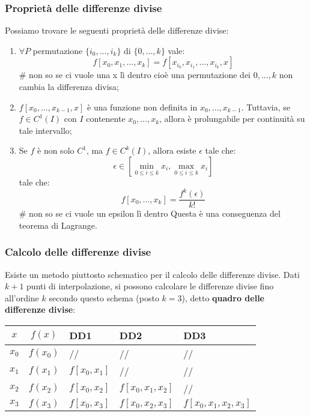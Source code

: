 \documentclass[a4paper,11pt]{article}
\begin{document}
\subsubsection{Proprietà delle differenze divise}
Possiamo trovare le seguenti proprietà delle differenze divise:
\begin{enumerate}
	\item $\forall P$ permutazione $\{i_0, ..., i_k\}$ di $\{0, ..., k \}$ vale:
		$$
			f[x_0, x_1, ..., x_k] = f[x_{i_0}, x_{i_1}, ..., x_{i_k}, x]
		$$ # non so se ci vuole una x lì dentro
		cioè una permutazione dei $0, ..., k$ non cambia la differenza divisa;

	\item $f[x_0, ..., x_{k - 1}, x]$ è una funzione non definita in $x_0, ..., x_{k-1}$.
		Tuttavia, se $f \in C^1(I)$ con $I$ contenente $x_0, ..., x_k$, allora è prolungabile per continuità su tale intervallo;

	\item Se $f$ è non solo $C^1$, ma $f \in C^k(I)$, allora esiste $\epsilon$ tale che:
		$$
		\epsilon \in \left[ \min_{0 \leq i \leq k} x_i, \max_{0 \leq i \leq k} x_i \right]
		$$
		tale che:
		$$
		f[x_0, ..., x_k] = \frac{f^{k} (\epsilon) }{ k! }
		$$ # non so se ci vuole un epsilon lì dentro
		Questa è una conseguenza del teorema di Lagrange.
\end{enumerate}

\subsubsection{Calcolo delle differenze divise}
Esiste un metodo piuttosto schematico per il calcolo delle differenze divise.
Dati $k + 1$ punti di interpolazione, si possono calcolare le differenze divise fino all'ordine $k$ secondo questo schema (posto $k = 3$), detto \textbf{quadro delle differenze divise}:

\begin{table}[H]
	\center 
	\begin{tabular} { c | c | p{2cm}  p{2cm} p{2cm} }
		$x$ & $f(x)$ & DD1 & DD2 & DD3 \\
		\hline
		$x_0$ & $f(x_0)$ & // & // & // \\
		$x_1$ & $f(x_1)$ & $f[x_0, x_1]$ & // & // \\
		$x_2$ & $f(x_2)$ & $f[x_0, x_2]$ & $f[x_0, x_1, x_2]$ & // \\
		$x_3$ & $f(x_3)$ & $f[x_0, x_3]$ & $f[x_0, x_2, x_3]$ & $f[x_0, x_1, x_2, x_3]$ \\
	\end{tabular}
\end{table}
\end{document}
